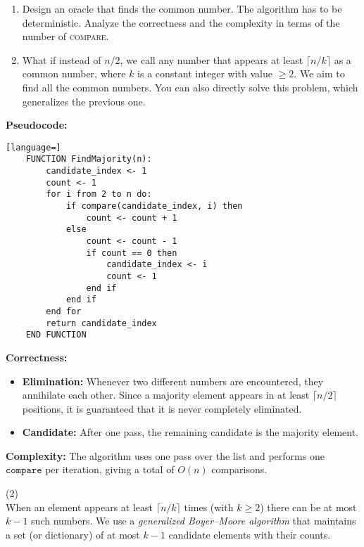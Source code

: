 \documentclass[letterpaper, 11pt]{article}
\newcommand{\1}{\mathds{1}}	%
\theoremstyle{definition}
\newenvironment{solution}{{\par\noindent\it Solution.}}{}
\begin{document}
\begin{enumerate}
    \item Design an oracle that finds the common number. The algorithm has to be deterministic. Analyze the correctness and the complexity in terms of the number of \textsc{compare}.
    \item What if instead of $n/2$, we call any number that appears at least $\lceil n/k \rceil$ as a common number, where $k$ is a constant integer with value $\geq2$. 
    We aim to find all the common numbers. You can also directly solve this problem, which generalizes the previous one.
\end{enumerate}
\begin{solution}
    \medskip
    \textbf{Pseudocode:}
    \begin{lstlisting}[language=]
    FUNCTION FindMajority(n):
        candidate_index <- 1
        count <- 1
        for i from 2 to n do:
            if compare(candidate_index, i) then
                count <- count + 1
            else
                count <- count - 1
                if count == 0 then
                    candidate_index <- i
                    count <- 1
                end if
            end if
        end for
        return candidate_index
    END FUNCTION
    \end{lstlisting}
    
    \medskip
    \textbf{Correctness:}  
    \begin{itemize}[itemsep=2mm]
        \item \textbf{Elimination:} Whenever two different numbers are encountered, they annihilate each other. Since a majority element appears in at least \(\lceil n/2 \rceil\) positions, it is guaranteed that it is never completely eliminated.
        \item \textbf{Candidate:} After one pass, the remaining candidate is the majority element.
    \end{itemize}
    
    \textbf{Complexity:}  
    The algorithm uses one pass over the list and performs one \(\mathtt{compare}\) per iteration, giving a total of \(O(n)\) comparisons.
    
    \bigskip
(2)
    \\When an element appears at least \(\lceil n/k \rceil\) times (with \(k \ge 2\)) there can be at most \(k-1\)
    such numbers. We use a \emph{generalized Boyer--Moore algorithm} that maintains a set (or dictionary) of at most \(k-1\) candidate elements with their counts.
    

\end{solution}
\end{document}
